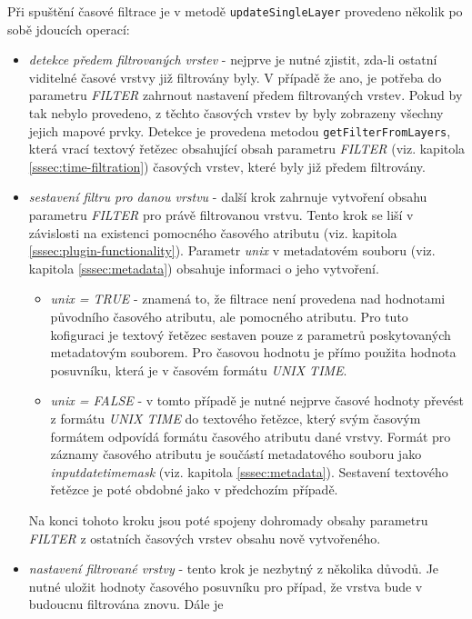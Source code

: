 Při spuštění časové filtrace je v metodě \verb|updateSingleLayer|
provedeno několik po sobě jdoucích operací:
\begin{itemize}
\item\textit{detekce předem filtrovaných vrstev} - nejprve je
nutné zjistit, zda-li ostatní viditelné časové vrstvy již
filtrovány byly. V případě že ano, je potřeba do parametru
\textit{FILTER} zahrnout nastavení předem filtrovaných
vrstev. Pokud by tak nebylo provedeno, z těchto časových
vrstev by byly zobrazeny všechny jejich mapové prvky. Detekce
je provedena metodou \verb|getFilterFromLayers|, která vrací
textový řetězec obsahující obsah parametru \textit{FILTER}
(viz. kapitola \ref{sssec:time-filtration}) časových vrstev,
které byly již předem filtrovány.
\item\textit{sestavení filtru pro danou vrstvu} - další krok
zahrnuje vytvoření obsahu parametru \textit{FILTER} pro právě
filtrovanou vrstvu. Tento krok se liší v závislosti na existenci
pomocného časového atributu (viz. kapitola \ref{sssec:plugin-functionality}). 
Parametr \textit{unix} v metadatovém souboru (viz. kapitola
\ref{sssec:metadata}) obsahuje informaci o jeho vytvoření.
\begin{itemize}
\item\textit{unix = TRUE} - znamená to, že filtrace není
provedena nad hodnotami původního časového atributu, ale
pomocného atributu. Pro tuto kofiguraci je textový řetězec
sestaven pouze z parametrů poskytovaných metadatovým
souborem. Pro časovou hodnotu je přímo použita hodnota
posuvníku, která je v časovém formátu \textit{UNIX TIME}.
\item\textit{unix = FALSE} - v tomto případě je
nutné nejprve časové hodnoty převést z formátu
\textit{UNIX TIME} do textového řetězce, který
svým časovým formátem odpovídá formátu časového
atributu dané vrstvy. Formát pro záznamy časového
atributu je součástí metadatového souboru jako
\textit{input\textunderscore datetime\textunderscore mask}
(viz. kapitola \ref{sssec:metadata}). Sestavení textového
řetězce je poté obdobné jako v předchozím případě.
\end{itemize}
Na konci tohoto kroku jsou poté spojeny dohromady obsahy parametru
\textit{FILTER} z ostatních časových vrstev obsahu nově vytvořeného.
\item\textit{nastavení filtrované vrstvy} - tento krok je nezbytný
z několika důvodů. Je nutné uložit hodnoty časového posuvníku
pro případ, že vrstva bude v budoucnu filtrována znovu. Dále je

\end{itemize}

